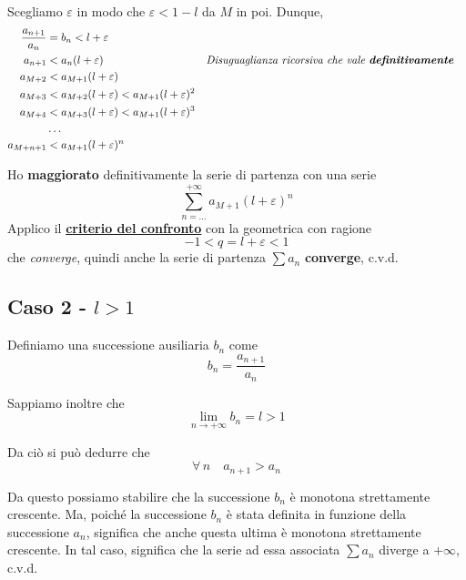\documentclass[../../analisi1]{subfiles}
\begin{document}
                Scegliamo \(\varepsilon\) in modo che \(\varepsilon < 1 - l\) da \(M\) in poi. Dunque,
                \begin{align*}
                    \frac{a_{n+1}}{a_n} &= b_n < l + \varepsilon \\
                    a_{n+1} &< a_n(l + \varepsilon) && \text{\emph{Disuguaglianza ricorsiva che vale \textbf{definitivamente}}} \\
                    a_{M+2} &< a_{M+1} (l + \varepsilon) \\
                    a_{M+3} &< a_{M+2} (l + \varepsilon) < a_{M+1}(l + \varepsilon)^{2}\\
                    a_{M+4} &< a_{M+3} (l + \varepsilon) < a_{M+1}(l + \varepsilon)^{3} \\
                    &\dots \\
                    a_{M+n+1} &< a_{M+1}(l + \varepsilon)^n
                \end{align*}

                Ho \textbf{maggiorato} definitivamente la serie di partenza con una serie
                \[ \sum_{n=\dots}^{+\infty} a_{M+1}(l + \varepsilon)^{n}\] 
                Applico il \textbf{\hyperref[serieconfronto]{criterio del confronto}} con la geometrica con ragione
                \[-1 < q = l + \varepsilon < 1 \]
                che \emph{converge}, quindi anche la serie di partenza \(\sum a_n \) \textbf{converge}, c.v.d.

            \subsection*{Caso 2 - \(l > 1\)}
                
                Definiamo una successione ausiliaria \(b_n\) come
                \[b_n = \frac{a_{n+1}}{a_n}\]

                Sappiamo inoltre che
                \[ \lim_{n \to +\infty}b_n = l > 1 \]

                Da ciò si può dedurre che
                \[\forall \, n \quad a_{n + 1} > a_n\]

                Da questo possiamo stabilire che la successione \(b_n\) è monotona strettamente crescente. Ma,
                poiché la successione \(b_n\) è stata definita in funzione della successione \(a_n\), significa
                che anche questa ultima è monotona strettamente crescente. In tal caso, significa che la serie ad
                essa associata \(\sum a_n\) diverge a \(+\infty\), c.v.d.
                
\end{document}

